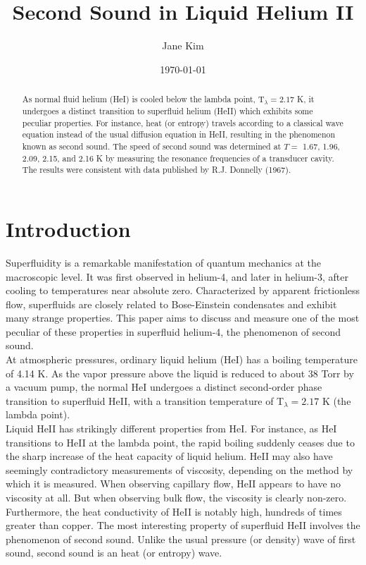 \documentclass[prb,aps,twocolumn,showpacs,10pt]{revtex4-1}
\begin{document}
\title {Second Sound in Liquid Helium II}

\author{Jane Kim}
\date{\today}


\begin{abstract}
\noindent As normal fluid helium (HeI) is cooled below the lambda point, T$_\lambda=2.17$ K, it undergoes a distinct transition to superfluid helium (HeII) which exhibits some peculiar properties. For instance, heat (or entropy) travels according to a classical wave equation instead of the usual diffusion equation in HeII, resulting in the phenomenon known as second sound. The speed of second sound was determined at $T =$ 1.67, 1.96, 2.09, 2.15, and 2.16 K by measuring the resonance frequencies of a transducer cavity. The results were consistent with data published by R.J. Donnelly (1967).\\
\end{abstract}



\maketitle

\section{Introduction}

Superfluidity is a remarkable manifestation of quantum mechanics at the macroscopic level. It was first observed in helium-4, and later in helium-3, after cooling to temperatures near absolute zero. Characterized by apparent frictionless flow\cite{nwe}, superfluids are closely related to Bose-Einstein condensates\cite{phy} and exhibit many strange properties. This paper aims to discuss and measure one of the most peculiar of these properties in superfluid helium-4, the phenomenon of second sound.\\

At atmospheric pressures, ordinary liquid helium (HeI) has a boiling temperature of 4.14 K. As the vapor pressure above the liquid is reduced to about 38 Torr\cite{phy} by a vacuum pump, the normal HeI undergoes a distinct second-order phase transition to superfluid HeII, with a transition temperature of T$_\lambda=2.17$ K (the lambda point). \\

Liquid HeII has strikingly different properties from HeI. For instance, as HeI transitions to HeII at the lambda point, the rapid boiling suddenly ceases due to the sharp increase of the heat capacity of liquid helium. HeII may also have seemingly contradictory measurements of viscosity, depending on the method by which it is measured. When observing capillary flow, HeII appears to have no viscosity at all. But when observing bulk flow, the viscosity is clearly non-zero. Furthermore, the heat conductivity of HeII is notably high, hundreds of times greater than copper. The most interesting property of superfluid HeII involves the phenomenon of second sound. Unlike the usual pressure (or density) wave of first sound, second sound is an heat (or entropy) wave. \cite{stanford}
\end{document}
